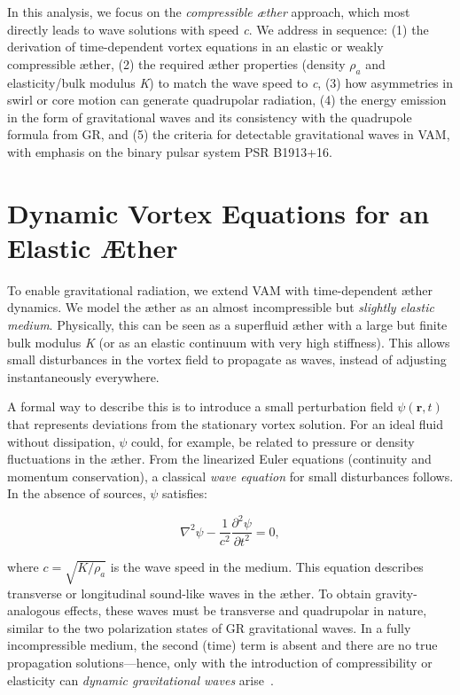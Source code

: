 In this analysis, we focus on the \textit{compressible æther} approach, which most directly leads to wave solutions with speed \textit{c}. We address in sequence: (1) the derivation of time-dependent vortex equations in an elastic or weakly compressible æther, (2) the required æther properties (density $ρ_a$ and elasticity/bulk modulus \textit{K}) to match the wave speed to \textit{c}, (3) how asymmetries in swirl or core motion can generate quadrupolar radiation, (4) the energy emission in the form of gravitational waves and its consistency with the quadrupole formula from GR, and (5) the criteria for detectable gravitational waves in VAM, with emphasis on the binary pulsar system PSR B1913+16.

\section*{Dynamic Vortex Equations for an Elastic Æther}
To enable gravitational radiation, we extend VAM with time-dependent æther dynamics. We model the æther as an almost incompressible but \textit{slightly elastic medium}. Physically, this can be seen as a superfluid æther with a large but finite bulk modulus \textit{K} (or as an elastic continuum with very high stiffness). This allows small disturbances in the vortex field to propagate as waves, instead of adjusting instantaneously everywhere.

A formal way to describe this is to introduce a small perturbation field $ψ(\mathbf{r},t)$ that represents deviations from the stationary vortex solution. For an ideal fluid without dissipation, $ψ$ could, for example, be related to pressure or density fluctuations in the æther. From the linearized Euler equations (continuity and momentum conservation), a classical \textit{wave equation} for small disturbances follows. In the absence of sources, $ψ$ satisfies:

\[
\nabla^2 \psi - \frac{1}{c^2} \frac{\partial^2 \psi}{\partial t^2} = 0,
\]

where $c = \sqrt{K/\rho_a}$ is the wave speed in the medium. This equation describes transverse or longitudinal sound-like waves in the æther. To obtain gravity-analogous effects, these waves must be transverse and quadrupolar in nature, similar to the two polarization states of GR gravitational waves. In a fully incompressible medium, the second (time) term is absent and there are no true propagation solutions—hence, only with the introduction of compressibility or elasticity can \textit{dynamic gravitational waves} arise~\cite{iskandarani2025VAM3}.

